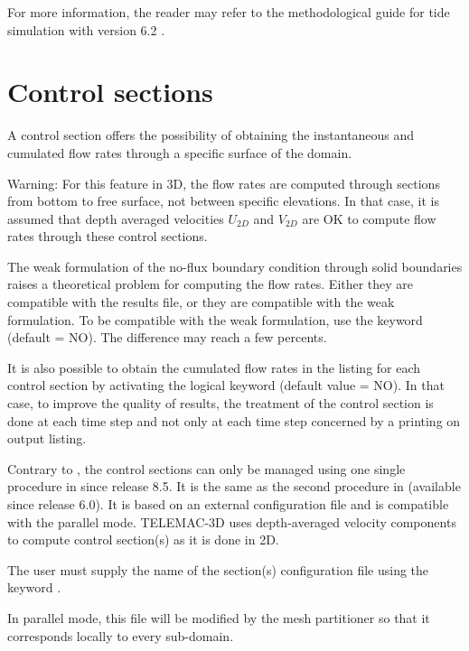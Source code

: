 For more information, the reader may refer to the methodological guide for tide
simulation with version 6.2 \cite{Pham2012}.

\section{Control sections}
\label{sec:ctrlsc}
A control section offers the possibility of obtaining the instantaneous
and cumulated flow rates through a specific surface of the domain.

\begin{WarningBlock}{Warning:}
For this feature in 3D, the flow rates are computed through sections
from bottom to free surface, not between specific elevations.
In that case, it is assumed that depth averaged velocities $U_{2D}$ and $V_{2D}$
are OK to compute flow rates through these control sections.
\end{WarningBlock}

The weak formulation of the no-flux boundary condition through solid boundaries
raises a theoretical problem for computing the flow rates.
Either they are compatible with the results file, or they are compatible
with the weak formulation.
To be compatible with the weak formulation, use the keyword
 (default = NO).
The difference may reach a few percents.

It is also possible to obtain the cumulated flow rates in the listing
for each control section
by activating the logical keyword 
(default value = NO).
In that case, to improve the quality of results, the treatment of the control
section is done at each time step and not only at each time step concerned
by a printing on output listing.

Contrary to , the control sections can only be managed using one
single procedure in  since release 8.5.
It is the same as the second procedure in  (available since release
6.0).
It is based on an external configuration file and is compatible with the
parallel mode.
TELEMAC-3D uses depth-averaged velocity components to compute control section(s)
as it is done in 2D.


The user must supply the name of the section(s) configuration file
using the keyword .

In parallel mode, this file will be modified by the mesh partitioner
so that it corresponds locally to every sub-domain.


